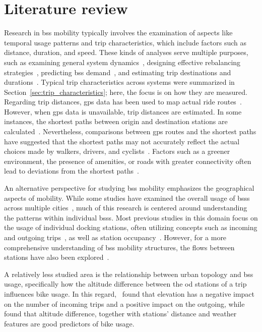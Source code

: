 \section{Literature review}

Research in \ac{bss} mobility typically involves the examination of aspects like temporal usage patterns and trip characteristics, which include factors such as distance, duration, and speed. These kinds of analyses serve multiple purposes, such as examining general system dynamics~\cite{Jensen2010, Ciancia2015, Zaltz2013}, designing effective rebalancing strategies~\cite{Chiariotti2018}, predicting \ac{bss} demand~\cite{Borgnat2011}, and estimating trip destinations and durations~\cite{Zhang2016Bicycle}. Typical trip characteristics across systems were summarized in Section~\ref{sec:trip_characteristics}; here, the focus is on how they are measured. Regarding trip distances, \ac{gps} data has been used to map actual ride routes~\cite{Talavera_Garcia2021}. However, when \ac{gps} data is unavailable, trip distances are estimated. In some instances, the shortest paths between origin and destination stations are calculated~\cite{Oliveira2016}. Nevertheless, comparisons between \ac{gps} routes and the shortest paths have suggested that the shortest paths may not accurately reflect the actual choices made by walkers, drivers, and cyclists~\cite{Zhu2015, Lu2018, Klein2023}. Factors such as a greener environment, the presence of amenities, or roads with greater connectivity often lead to deviations from the shortest paths~\cite{Klein2023}.

An alternative perspective for studying \ac{bss} mobility emphasizes the geographical aspects of mobility. While some studies have examined the overall usage of \acp{bss} across multiple cities~\cite{Zhao2014, DuranRodas2019, Sarkar2015}, much of this research is centered around understanding the patterns within individual \acp{bss}. Most previous studies in this domain focus on the usage of individual docking stations, often utilizing concepts such as incoming and outgoing trips~\cite{Moncayo2016, FaghihImani2014, Wang2016, FaghihImani2017Empirical, DuranRodas2019, Oliveira2016}, as well as station occupancy~\cite{OBrien2014, Sarkar2015}. However, for a more comprehensive understanding of \ac{bss} mobility structures, the flows between stations have also been explored~\cite{Corcoran2014, Yang2019, Kon2021}.

A relatively less studied area is the relationship between urban topology and \ac{bss} usage, specifically how the altitude difference between the \ac{od} stations of a trip influences bike usage. In this regard,~\cite{Morency2015} found that elevation has a negative impact on the number of incoming trips and a positive impact on the outgoing, while~\cite{Kim2020} found that altitude difference, together with stations' distance and weather features are good predictors of bike usage.

